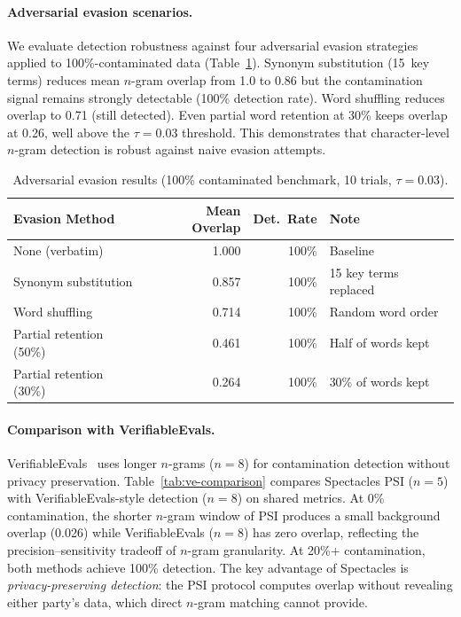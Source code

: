 \documentclass[11pt]{article}
\begin{document}
\paragraph{Adversarial evasion scenarios.}
We evaluate detection robustness against four adversarial evasion
strategies applied to 100\%-contaminated data
(Table~\ref{tab:adversarial}).  Synonym substitution (15~key terms)
reduces mean $n$-gram overlap from 1.0 to 0.86 but the contamination
signal remains strongly detectable (100\% detection rate).
Word shuffling reduces overlap to 0.71 (still detected).
Even partial word retention at 30\% keeps overlap at 0.26, well above
the $\tau = 0.03$ threshold.  This demonstrates that character-level
$n$-gram detection is robust against naive evasion attempts.

\begin{table}[t]
\centering
\caption{Adversarial evasion results (100\% contaminated benchmark,
  10 trials, $\tau = 0.03$).}
\label{tab:adversarial}
\smallskip
\begin{tabular}{@{}lrrl@{}}
\toprule
\textbf{Evasion Method} & \textbf{Mean Overlap} & \textbf{Det.\ Rate} & \textbf{Note} \\
\midrule
None (verbatim) & 1.000 & 100\% & Baseline \\
Synonym substitution & 0.857 & 100\% & 15 key terms replaced \\
Word shuffling & 0.714 & 100\% & Random word order \\
Partial retention (50\%) & 0.461 & 100\% & Half of words kept \\
Partial retention (30\%) & 0.264 & 100\% & 30\% of words kept \\
\bottomrule
\end{tabular}
\end{table}

\paragraph{Comparison with VerifiableEvals.}
VerifiableEvals~\cite{south2024verifiableevals} uses longer $n$-grams
($n=8$) for contamination detection without privacy preservation.
Table~\ref{tab:ve-comparison} compares Spectacles PSI ($n=5$) with
VerifiableEvals-style detection ($n=8$) on shared metrics.
At 0\% contamination, the shorter $n$-gram window of PSI produces
a small background overlap (0.026) while VerifiableEvals ($n=8$) has
zero overlap, reflecting the precision--sensitivity tradeoff of
$n$-gram granularity.  At 20\%+ contamination, both methods achieve
100\% detection.  The key advantage of Spectacles is
\emph{privacy-preserving detection}: the PSI protocol computes overlap
without revealing either party's data, which direct $n$-gram matching
cannot provide.
\end{document}
